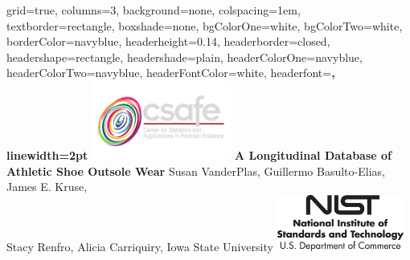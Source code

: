 \documentclass[landscape, a0paper, fontscale=0.275, margin = 30mm]{baposter} %
\begin{document}
\begin{poster}
{
grid=true,
columns=3,
background=none,
colspacing=1em, %
textborder=rectangle, %
boxshade=none,
bgColorOne=white,
bgColorTwo=white,
borderColor=navyblue,
headerheight=0.14\textheight, %
headerborder=closed, %
headershape=rectangle, %
headershade=plain,
headerColorOne=navyblue,
headerColorTwo=navyblue,
headerFontColor=white,
headerfont=\Large\bf, %
linewidth=2pt %
}
%
{\includegraphics[height=7em]{logo.png}} %
{\huge\bf A Longitudinal Database of Athletic Shoe Outsole Wear\vspace{0.3em}} %
{{\Large Susan VanderPlas, Guillermo Basulto-Elias, James E. Kruse, \\Stacy Renfro, Alicia Carriquiry, Iowa State University}\vspace*{-0.6em}} %
{\includegraphics[height=5em]{logo-NIST.jpg}} %




\end{poster}
\end{document}
